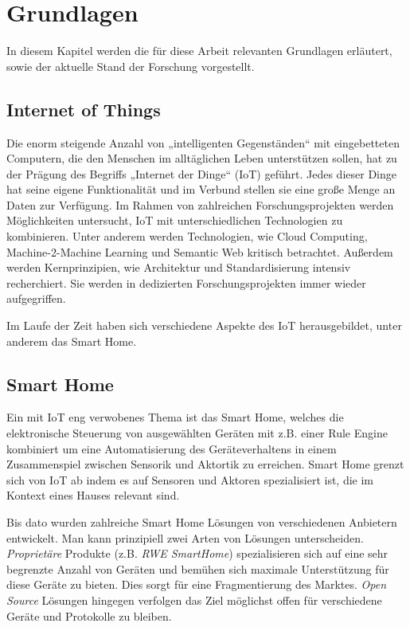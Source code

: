 \documentclass[12pt]{article}
\begin{document}
\maketitle


\section{Grundlagen}
In diesem Kapitel werden die für diese Arbeit relevanten Grundlagen erläutert, sowie der aktuelle Stand der Forschung vorgestellt.

\subsection{Internet of Things}
Die enorm steigende Anzahl von „intelligenten Gegenständen“ mit eingebetteten Computern, die den Menschen im alltäglichen Leben unterstützen sollen, hat zu der Prägung des Begriffs „Internet der Dinge“ (IoT) geführt. Jedes dieser Dinge hat seine eigene Funktionalität und im Verbund stellen sie eine große Menge an Daten zur Verfügung. Im Rahmen von zahlreichen Forschungsprojekten \cite{ierc:portfolios} werden Möglichkeiten untersucht, IoT mit unterschiedlichen Technologien zu kombinieren. Unter anderem werden Technologien, wie Cloud Computing, Machine-2-Machine Learning und Semantic Web kritisch betrachtet. Außerdem werden Kernprinzipien, wie Architektur und Standardisierung intensiv recherchiert. Sie werden in dedizierten Forschungsprojekten \cite{icore:achitecture}\cite{iota:d25} immer wieder aufgegriffen.

Im Laufe der Zeit haben sich verschiedene Aspekte des IoT herausgebildet, unter anderem das Smart Home.

\subsection{Smart Home}
Ein mit IoT eng verwobenes Thema ist das Smart Home\cite{SmartHomeIoT}, welches die elektronische Steuerung von ausgewählten Geräten mit z.B. einer Rule Engine kombiniert um eine Automatisierung des Geräteverhaltens in einem Zusammenspiel zwischen Sensorik und Aktortik zu erreichen. Smart Home grenzt sich von IoT ab indem es auf Sensoren und Aktoren spezialisiert ist, die im Kontext eines Hauses relevant sind.

Bis dato wurden zahlreiche Smart Home Lösungen von verschiedenen Anbietern entwickelt. Man kann prinzipiell zwei Arten von Lösungen unterscheiden. \textit{Proprietäre} Produkte (z.B. \textit{RWE SmartHome}) spezialisieren sich auf eine sehr begrenzte Anzahl von Geräten und bemühen sich maximale Unterstützung für diese Geräte zu bieten. Dies sorgt für eine Fragmentierung des Marktes. \textit{Open Source} Lösungen hingegen verfolgen das Ziel möglichst offen für verschiedene Geräte und Protokolle zu bleiben. 
\end{document}
